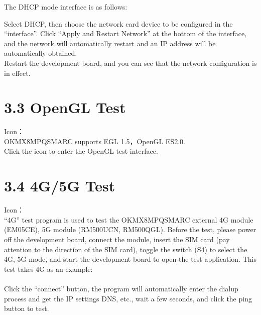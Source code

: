 \documentclass[letterpaper,10pt,openany,english]{sphinxmanual}
\begin{document}
\sphinxAtStartPar
{}

\sphinxAtStartPar
The DHCP mode interface is as follows:\\

\sphinxAtStartPar
Select DHCP, then choose the network card device to be configured in the “interface”. Click “Apply and Restart Network” at the bottom of the interface, and the network will automatically restart and an IP address will be automatically obtained.\\
Restart the development board, and you can see that the network configuration is in effect.\\


\section{3.3 OpenGL Test}
\label{\detokenize{linux-manual:opengl-test}}
\sphinxAtStartPar
Icon：\\
OK\sphinxhyphen{}MX8MPQ\sphinxhyphen{}SMARC supports EGL 1.5，OpenGL ES2.0.\\
Click the icon to enter the OpenGL test interface.


\section{3.4 4G/5G Test}
\label{\detokenize{linux-manual:g-5g-test}}
\sphinxAtStartPar
Icon：\\
“4G” test program is used to test the OK\sphinxhyphen{}MX8MPQ\sphinxhyphen{}SMARC external 4G module (EM05\sphinxhyphen{}CE), 5G module (RM500U\sphinxhyphen{}CN, RM500Q\sphinxhyphen{}GL). Before the test, please power off the development board, connect the module, insert the SIM card (pay attention to the direction of the SIM card), toggle the switch (S4) to select the 4G, 5G mode, and start the development board to open the test application. This test takes 4G as an example:\\
\\
Click the “connect” button, the program will automatically enter the dial\sphinxhyphen{}up process and get the IP settings DNS, etc., wait a few seconds, and click the ping button to test.
\end{document}
